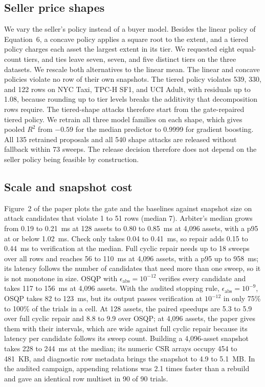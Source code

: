 \documentclass[10pt]{article}
\begin{document}


\subsection{Seller price shapes}
We vary the seller's policy instead of a buyer model. Besides the linear policy of Equation~6, a concave policy applies a square root to the extent, and a tiered policy charges each asset the largest extent in its tier. We requested eight equal-count tiers, and ties leave seven, seven, and five distinct tiers on the three datasets. We rescale both alternatives to the linear mean. The linear and concave policies violate no row of their own snapshots. The tiered policy violates 539, 330, and 122 rows on NYC Taxi, TPC-H SF1, and UCI Adult, with residuals up to 1.08, because rounding up to tier levels breaks the additivity that decomposition rows require. The tiered-shape attacks therefore start from the gate-repaired tiered policy. We retrain all three model families on each shape, which gives pooled $R^2$ from $-0.59$ for the median predictor to 0.9999 for gradient boosting. All 135 retrained proposals and all 540 shape attacks are released without fallback within 73 sweeps. The release decision therefore does not depend on the seller policy being feasible by construction.

\subsection{Scale and snapshot cost}
Figure~2 of the paper plots the gate and the baselines against snapshot size on attack candidates that violate 1 to 51 rows (median 7). Arbiter's median grows from 0.19 to 0.21~ms at 128 assets to 0.80 to 0.85~ms at 4{,}096 assets, with a p95 at or below 1.02~ms. Check only takes 0.04 to 0.41~ms, so repair adds 0.15 to 0.44~ms to verification at the median. Full cyclic repair needs up to 18 sweeps over all rows and reaches 56 to 110~ms at 4{,}096 assets, with a p95 up to 958~ms; its latency follows the number of candidates that need more than one sweep, so it is not monotone in size. OSQP with $\epsilon_{\mathrm{abs}} = 10^{-12}$ verifies every candidate and takes 117 to 156~ms at 4{,}096 assets. With the audited stopping rule, $\epsilon_{\mathrm{abs}} = 10^{-9}$, OSQP takes 82 to 123~ms, but its output passes verification at $10^{-12}$ in only 75\% to 100\% of the trials in a cell. At 128 assets, the paired speedups are 5.3 to 5.9 over full cyclic repair and 8.8 to 9.9 over OSQP; at 4{,}096 assets, the paper gives them with their intervals, which are wide against full cyclic repair because its latency per candidate follows its sweep count. Building a 4{,}096-asset snapshot takes 228 to 244~ms at the median; its numeric CSR arrays occupy 454 to 481~KB, and diagnostic row metadata brings the snapshot to 4.9 to 5.1~MB. In the audited campaign, appending relations was 2.1 times faster than a rebuild and gave an identical row multiset in 90 of 90 trials.
\end{document}
